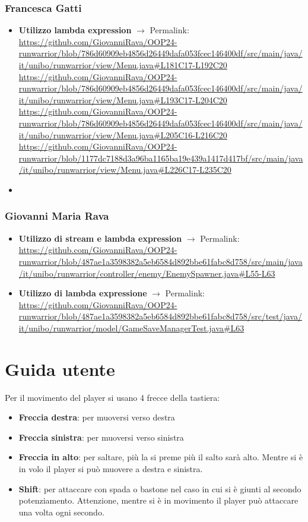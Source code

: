 \documentclass[a4paper,12pt]{report}
\begin{document}
\subsection{Francesca Gatti}
\begin{itemize}
    \item \textbf{Utilizzo lambda expression} $\rightarrow$ Permalink:
    \url{https://github.com/GiovanniRava/OOP24-runwarrior/blob/786d60909eb4856d26449dafa053fcec146400df/src/main/java/it/unibo/runwarrior/view/Menu.java#L181C17-L192C20}
    \url{https://github.com/GiovanniRava/OOP24-runwarrior/blob/786d60909eb4856d26449dafa053fcec146400df/src/main/java/it/unibo/runwarrior/view/Menu.java#L193C17-L204C20}
    \url{https://github.com/GiovanniRava/OOP24-runwarrior/blob/786d60909eb4856d26449dafa053fcec146400df/src/main/java/it/unibo/runwarrior/view/Menu.java#L205C16-L216C20}
    \url{https://github.com/GiovanniRava/OOP24-runwarrior/blob/1177dc7188d3a96ba1165ba19e439a1417d417bf/src/main/java/it/unibo/runwarrior/view/Menu.java#L226C17-L235C20}
    \item
\end{itemize}
\subsection{Giovanni Maria Rava}
\begin{itemize}
    \item \textbf{Utilizzo di stream e lambda expression} $\rightarrow$ Permalink: 
    \url{https://github.com/GiovanniRava/OOP24-runwarrior/blob/487ae1a3598382a5eb6584d892bbe61fabc8d758/src/main/java/it/unibo/runwarrior/controller/enemy/EnemySpawner.java#L55-L63}
    \item \textbf{Utilizzo di lambda expressione} $\rightarrow$ Permalink:
    \url{https://github.com/GiovanniRava/OOP24-runwarrior/blob/487ae1a3598382a5eb6584d892bbe61fabc8d758/src/test/java/it/unibo/runwarrior/model/GameSaveManagerTest.java#L63}
\end{itemize}
\appendix
\chapter{Guida utente}
Per il movimento del player si usano 4 frecce della tastiera:
\begin{itemize}
    \item \textbf{Freccia destra}: per muoversi verso destra
    \item \textbf{Freccia sinistra}: per muoversi verso sinistra
    \item \textbf{Freccia in alto}: per saltare, più la si preme più il salto sarà alto.
    Mentre si è in volo il player si può muovere a destra e sinistra.
    \item \textbf{Shift}: per attaccare con spada o bastone nel caso in cui si è giunti al secondo potenziamento.
    Attenzione, mentre si è in movimento il player può attaccare una volta ogni secondo.
\end{itemize}
\end{document}
